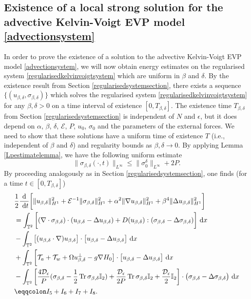 \documentclass[12pt,a4paper]{article}
\theoremstyle{definition}
\theoremstyle{remark}
\numberwithin{equation}{section}
\newcommand{\dx}{\ {\rm d} {x}}
\newcommand{\dt}{\ {\rm d} t }
\DeclareMathOperator{\Tr}{Tr}
\begin{document}
\subsection{Existence of a local strong solution for the advective Kelvin-Voigt EVP model \eqref{advectionsystem}} \label{limitsection}
In order to prove the existence of a solution to the advective Kelvin-Voigt EVP model \eqref{advectionsystem}, we will now obtain energy estimates on the regularised system \eqref{regularisedkelvinvoigtsystem} which are uniform in $\beta$ and $\delta$. By the existence result from Section \ref{regularisedsystemsection}, there exists a sequence $\{ (u_{\beta,\delta}, \sigma_{\beta,\delta} ) \} $ which solves the regularised system \eqref{regularisedkelvinvoigtsystem} for any $\beta, \delta > 0$ on a time interval of existence $[0,T_{\beta,\delta}]$. The existence time $T_{\beta,\delta}$ from Section \ref{regularisedsystemsection} is independent of $N$ and $\epsilon$, but it does depend on $\alpha$, $\beta$, $\delta$, $\mathcal{E}$, $P$, $u_0$, $\sigma_0$ and the parameters of the external forces. We need to show that these solutions have a uniform time of existence $T$ (i.e., independent of $\beta$ and $\delta$) and regularity bounds as $\beta,\delta \rightarrow 0$. By applying Lemma \ref{Lpestimatelemma}, we have the following uniform estimate
\begin{equation} \label{Linftyestimate}
\lVert \sigma_{\beta,\delta} (\cdot, t) \rVert_{L^\infty} \leq \lVert \sigma_0^\delta \rVert_{L^\infty} + 2 P.
\end{equation}
By proceeding analogously as in Section \ref{regularisedsystemsection}, one finds (for a time $t \in [0, T_{\beta,\delta}]$)
\begin{align*}
&\frac{1}{2} \frac{\textrm{d}}{\dt} \bigg[ \lVert u_{\beta,\delta} \rVert_{H^1}^2 + \mathcal{E}^{-1} \lVert \sigma_{\beta,\delta} \rVert_{H^1}^2 + \alpha^2 \lVert \nabla u_{\beta,\delta} \rVert_{H^1}^2 + \beta^4 \lVert \Delta u_{\beta,\delta} \rVert_{H^1}^2 \bigg] \\
&= \int_{\mathbb{T}^2} \bigg[ (\nabla \cdot \sigma_{\beta,\delta}) \cdot (u_{\beta,\delta} - \Delta u_{\beta,\delta}) + D(u_{\beta,\delta}) : (\sigma_{\beta,\delta} - \Delta \sigma_{\beta,\delta}) \bigg] \dx \\
&- \int_{\mathbb{T}^2} \big[(u_{\beta,\delta} \cdot \nabla) u_{\beta,\delta} \big] \cdot \big[u_{\beta,\delta} - \Delta u_{\beta,\delta} \big] \dx \\
&+ \int_{\mathbb{T}^2} \bigg[ \mathcal{T}_a + \mathcal{T}_w + \Omega u^\perp_{\beta,\delta} - g \nabla H_0 \big] \cdot \big[u_{\beta,\delta} - \Delta u_{\beta,\delta} \big] \dx \\
&- \int_{\mathbb{T}^2} \bigg[ \frac{4 \mathcal{D}_\epsilon}{P} (\sigma_{\beta,\delta} - \frac{1}{2} \Tr \sigma_{\beta,\delta} \mathbb I_2) + \frac{\mathcal{D}_\epsilon}{2 P} \Tr \sigma_{\beta,\delta} \mathbb I_2 + \frac{\mathcal{D}_\epsilon}{2} \mathbb I_2 \bigg] \cdot \big(\sigma_{\beta,\delta} - \Delta \sigma_{\beta,\delta} \big) \dx \\
&\eqqcolon I_5 + I_6 + I_7 + I_8.
\end{align*}
\end{document}
